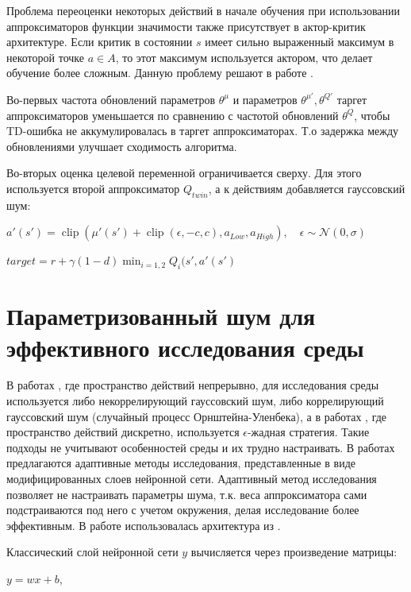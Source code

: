 \documentclass{mipt-thesis-bs}
\begin{document}
Проблема переоценки некоторых действий в начале обучения при использовании аппроксиматоров функции значимости также присутствует в актор-критик архитектуре. Если критик в состоянии $s$ имеет сильно выраженный максимум в некоторой точке $a\in A$, то этот максимум используется актором, что делает обучение более сложным. Данную проблему решают в работе \cite{td3}.

Во-первых частота обновлений параметров $\theta^\mu$ и параметров $\theta^{\mu'}, \theta^{Q'}$ таргет аппроксиматоров уменьшается по сравнению с частотой обновлений $\theta^Q$, чтобы TD-ошибка не аккумулировалась в таргет аппроксиматорах. Т.о задержка между обновлениями улучшает сходимость алгоритма.

Во-вторых оценка целевой переменной ограничивается сверху. Для этого используется второй аппроксиматор $Q_{twin}$, а к действиям добавляется гауссовский шум:

\begin{center}
    $a'(s')=\operatorname{clip}(\mu'(s')+\operatorname{clip}(\epsilon,-c, c), a_{L o w}, a_{H i g h}), \quad \epsilon \sim \mathcal{N}(0, \sigma)$
    
    $target=r+\gamma(1-d) \min _{i=1,2} Q_i(s', a'(s')$
\end{center}

\section{Параметризованный шум для эффективного исследования среды}

В работах \cite{ddpg, td3}, где пространство действий непрерывно, для исследования среды используется либо некоррелирующий гауссовский шум, либо коррелирующий гауссовский шум (случайный процесс Орнштейна-Уленбека), а в работах \cite{dqn, dueling dqn, double dqn, dqfd}, где пространство действий дискретно, используется $\epsilon$-жадная стратегия. Такие подходы не учитывают особенностей среды и их трудно настраивать. В работах \cite{noisy layers, adaptive noise} предлагаются адаптивные методы исследования, представленные в виде модифицированных слоев нейронной сети. Адаптивный метод исследования позволяет не настраивать параметры шума, т.к. веса аппроксиматора сами подстраиваются под него с учетом окружения, делая исследование более эффективным. 
В работе использовалась архитектура из \cite{noisy layers}. 

Классический слой нейронной сети $y$ вычисляется через произведение матрицы:

\begin{center}
    $y=w x+b$,
\end{center}
\end{document}
